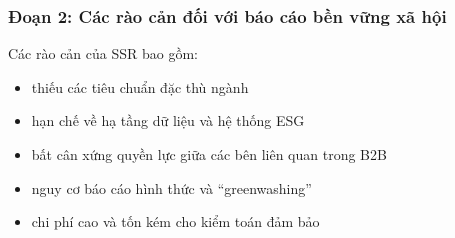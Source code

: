 \subsubsection{Đoạn 2: Các rào cản đối với báo cáo bền vững xã hội}

Các rào cản của SSR bao gồm:
\begin{itemize}
\item thiếu các tiêu chuẩn đặc thù ngành \parencite{Bochkay2025}
\item hạn chế về hạ tầng dữ liệu và hệ thống ESG \parencite{Troshani2024,ElBaz2022,Jona2023,Belal2015}
\item bất cân xứng quyền lực giữa các bên liên quan trong B2B \parencite{Dai2021}
\item nguy cơ báo cáo hình thức và “greenwashing” \parencite{Reitmaier2024,Belal2015}
\item chi phí cao và tốn kém cho kiểm toán đảm bảo \parencite{Dai2021,Najjar2023}
\end{itemize}